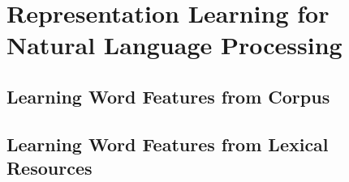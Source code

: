 \chapter{Representation Learning for Natural Language Processing}
\label{ch:word-embeddings}

\section{Learning Word Features from Corpus}
\label{ssec:lang-model}



\section{Learning Word Features from Lexical Resources}
\label{sec:structured-word-embedding}

